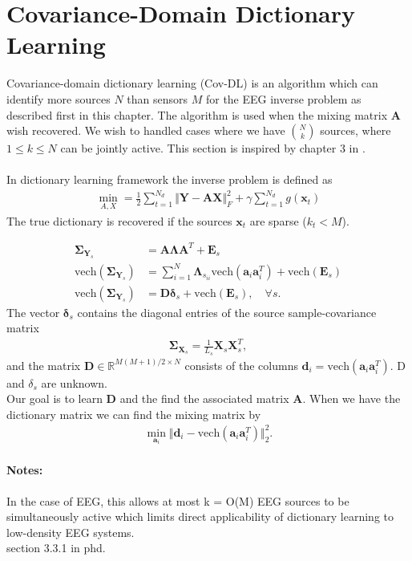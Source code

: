 \section{Covariance-Domain Dictionary Learning}
Covariance-domain dictionary learning (Cov-DL) is an algorithm which can identify more sources $N$ than sensors $M$ for the EEG inverse problem as described first in this chapter. The algorithm is used when the mixing matrix $\mathbf{A}$ wish recovered. We wish to handled cases where we have $\binom{N}{k}$ sources, where $1 \leq k \leq N$ can be jointly active. This section is inspired by chapter 3 in \cite{phd2015}.
\\ \\
In dictionary learning framework the inverse problem is defined as
\begin{align*}
\min_{A,X} = \frac{1}{2} \sum_{t=1}^{N_d} \Vert \mathbf{Y} - \mathbf{AX} \Vert_F^2 + \gamma \sum_{t=1}^{N_d} g(\mathbf{x}_t)
\end{align*}
The true dictionary is recovered if the sources $\mathbf{x}_t$ are sparse ($k_t < M$).


\begin{align*}
\boldsymbol{\Sigma}_{\mathbf{Y}_s} &= \mathbf{A} \boldsymbol{\Lambda} \mathbf{A}^T + \mathbf{E}_s \\
\text{vech}(\boldsymbol{\Sigma}_{\mathbf{Y}_s}) &= \sum_{i=1}^N \boldsymbol{\Lambda}_{s_{ii}} \text{vech}(\mathbf{a}_i \mathbf{a}_i^T) + \text{vech}(\mathbf{E}_s) \\
\text{vech}(\boldsymbol{\Sigma}_{\mathbf{Y}_s}) &= \mathbf{D} \boldsymbol{\delta}_s + \text{vech}(\mathbf{E}_s), \quad \forall s.
\end{align*}
The vector $\boldsymbol{\delta}_s$ contains the diagonal entries of the source sample-covariance matrix
\begin{align*}
\boldsymbol{\Sigma}_{\mathbf{X}_s} = \frac{1}{L_s} \mathbf{X}_s \mathbf{X}_s^T,
\end{align*}
and the matrix $\mathbf{D} \in \mathbb{R}^{M(M+1)/2 \times N}$ consists of the columns $\mathbf{d}_i = \text{vech}(\mathbf{a}_i \mathbf{a}_i^T)$. D and $\delta_s$ are unknown.
\\
Our goal is to learn $\mathbf{D}$ and the find the associated matrix $\mathbf{A}$. When we have the dictionary matrix we can find  the mixing matrix by
\begin{align*}
\min_{\mathbf{a}_i} \Vert \mathbf{d}_i - \text{vech}(\mathbf{a}_i \mathbf{a}_i^T) \Vert_2^2.
\end{align*}


\paragraph{Notes:}
In the case of EEG, this allows at most k = O(M) EEG sources to be simultaneously active which limits direct applicability of dictionary learning to low-density EEG systems.
\\
section 3.3.1 in phd.
















